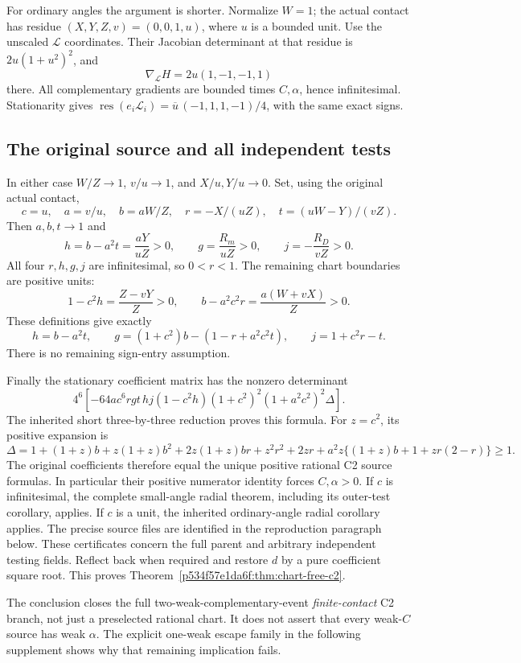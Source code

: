 For ordinary angles the argument is shorter. Normalize \(W=1\);
the actual contact has residue
\((X,Y,Z,v)=(0,0,1,u)\), where \(u\) is a bounded unit.
Use the unscaled \(\mathcal L\) coordinates. Their Jacobian determinant
at that residue is \(2u(1+u^2)^2\), and
\[
\nabla_{\mathcal L}H=2u(1,-1,-1,1)
\]
there. All complementary gradients are bounded times \(C,\alpha\),
hence infinitesimal. Stationarity gives
\(\operatorname{res}(e_i\mathcal L_i)
 =\overline u\,(-1,1,1,-1)/4\), with the same exact signs.

\subsection{The original source and all independent tests}
In either case \(W/Z\to1\), \(v/u\to1\), and \(X/u,Y/u\to0\).
Set, using the original actual contact,
\[
c=u,\quad a=v/u,\quad b=aW/Z,\quad
r=-X/(uZ),\quad t=(uW-Y)/(vZ).
\]
Then \(a,b,t\to1\) and
\[
h=b-a^2t=\frac{aY}{uZ}>0,\qquad
g=\frac{R_m}{uZ}>0,\qquad j=-\frac{R_D}{vZ}>0.
\]
All four \(r,h,g,j\) are infinitesimal, so \(0<r<1\).
The remaining chart boundaries are positive units:
\[
1-c^2h=\frac{Z-vY}{Z}>0,\qquad
b-a^2c^2r=\frac{a(W+vX)}Z>0.
\]
These definitions give exactly
\[
h=b-a^2t,\qquad
g=(1+c^2)b-(1-r+a^2c^2t),\qquad j=1+c^2r-t.
\]
There is no remaining sign-entry assumption.

Finally the stationary coefficient matrix has the nonzero determinant
\[
4^6[-64ac^6rgt\,hj(1-c^2h)(1+c^2)^2(1+a^2c^2)^2\Delta].
\]
The inherited short three-by-three reduction proves this formula.
For \(z=c^2\), its positive expansion is
\[
\Delta=1+(1+z)b+z(1+z)b^2+2z(1+z)br+z^2r^2+2zr
       +a^2z\{(1+z)b+1+zr(2-r)\}\ge1.
\]
The original coefficients
therefore equal the unique positive rational C2 source formulas.
In particular their positive numerator identity forces \(C,\alpha>0\).
If \(c\) is infinitesimal, the complete small-angle radial theorem,
including its outer-test corollary, applies. If \(c\) is a unit,
the inherited ordinary-angle radial corollary applies. The precise
source files are identified in the reproduction paragraph below. These certificates concern
the full parent and arbitrary independent testing fields. Reflect back
when required and restore \(d\) by a pure coefficient square root.
This proves Theorem~\ref{p534f57e1da6f:thm:chart-free-c2}.

The conclusion closes the full two-weak-complementary-event
\emph{finite-contact} C2 branch, not just a preselected rational chart.
It does not assert that every weak-\(C\) source has weak \(\alpha\).
The explicit one-weak escape family in the following supplement shows
why that remaining implication fails.
